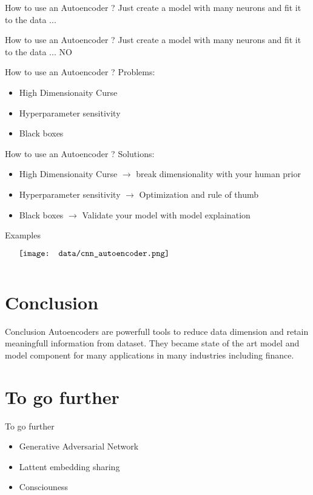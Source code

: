 \documentclass{beamer}
\begin{document}
\begin{frame}{How to use an Autoencoder ?}
    Just create a model with many neurons and fit it to the data ...
\end{frame}

\begin{frame}{How to use an Autoencoder ?}
    Just create a model with many neurons and fit it to the data ... NO
\end{frame}

\begin{frame}{How to use an Autoencoder ?}
    Problems:
    \begin{itemize}
        \item High Dimensionaity Curse
        \item Hyperparameter sensitivity 
        \item Black boxes 
    \end{itemize}
\end{frame}

\begin{frame}{How to use an Autoencoder ?}
    Solutions:
    \begin{itemize}
        \item High Dimensionaity Curse $\rightarrow$ break dimensionality with your human prior
        \item Hyperparameter sensitivity $\rightarrow$ Optimization and rule of thumb 
        \item Black boxes $\rightarrow$ Validate your model with model explaination
    \end{itemize}
\end{frame}

\begin{frame}{Examples}
    \begin{minipage}{5in}
    \centering
    $\vcenter{
    \texttt{[image: data/cnn\_autoencoder.png]} \\
    }$
    \end{minipage}

\end{frame}

\section{Conclusion}
\begin{frame}{Conclusion}
    Autoencoders are powerfull tools to reduce data dimension and retain meaningfull information from dataset.
    They became state of the art model and model component for many applications in many industries including finance.
\end{frame}

\section{To go further}
\begin{frame}{To go further}
\begin{itemize}
        \item Generative Adversarial Network
        \item Lattent embedding sharing
        \item Consciouness
\end{itemize}
\end{frame}
\end{document}
